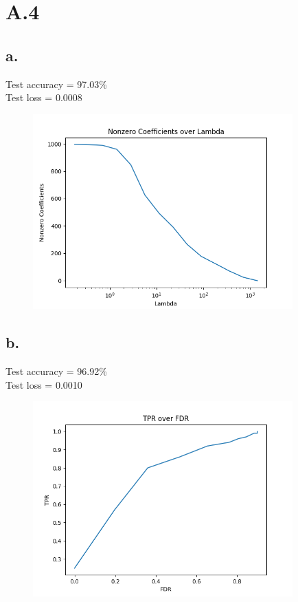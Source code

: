 \documentclass{article}
\newcommand{\1}{\mathbf{1}}
\begin{document}
\section*{A.4}
{\Large 

\subsection*{a.}

Test accuracy = 97.03\% \\
Test loss = 0.0008

\begin{figure}[h]
  \centering
  \includegraphics[width=100mm]{../hw2-code/results/a4_a.png}
\end{figure}

\subsection*{b.}

Test accuracy = 96.92\% \\
Test loss = 0.0010

\begin{figure}[h]
  \centering
  \includegraphics[width=100mm]{../hw2-code/results/a4_b.png}
\end{figure}

}
\end{document}
